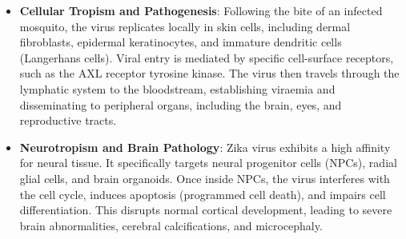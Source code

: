 \begin{itemize}
\item \textbf{Cellular Tropism and Pathogenesis}: Following the bite of an infected mosquito, the virus replicates locally in skin cells, including dermal fibroblasts, epidermal keratinocytes, and immature dendritic cells (Langerhans cells). Viral entry is mediated by specific cell-surface receptors, such as the AXL receptor tyrosine kinase. The virus then travels through the lymphatic system to the bloodstream, establishing viraemia and disseminating to peripheral organs, including the brain, eyes, and reproductive tracts.
\item \textbf{Neurotropism and Brain Pathology}: Zika virus exhibits a high affinity for neural tissue. It specifically targets neural progenitor cells (NPCs), radial glial cells, and brain organoids. Once inside NPCs, the virus interferes with the cell cycle, induces apoptosis (programmed cell death), and impairs cell differentiation. This disrupts normal cortical development, leading to severe brain abnormalities, cerebral calcifications, and microcephaly.
\end{itemize}

